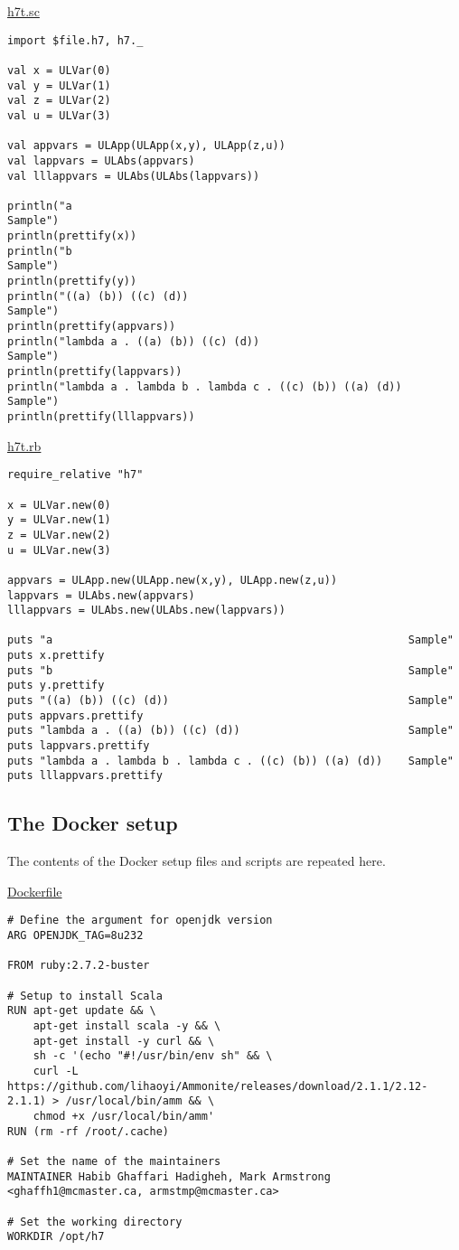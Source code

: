\documentclass[11pt]{article}
\begin{document}
\href{./testing/h7/h7t.sc}{h7t.sc}
\begin{verbatim}
import $file.h7, h7._

val x = ULVar(0)
val y = ULVar(1)
val z = ULVar(2)
val u = ULVar(3)

val appvars = ULApp(ULApp(x,y), ULApp(z,u))
val lappvars = ULAbs(appvars)
val lllappvars = ULAbs(ULAbs(lappvars))

println("a                                                       Sample")
println(prettify(x))
println("b                                                       Sample")
println(prettify(y))
println("((a) (b)) ((c) (d))                                     Sample")
println(prettify(appvars))
println("lambda a . ((a) (b)) ((c) (d))                          Sample")
println(prettify(lappvars))
println("lambda a . lambda b . lambda c . ((c) (b)) ((a) (d))    Sample")
println(prettify(lllappvars))
\end{verbatim}

\href{./testing/h7/h7t.rb}{h7t.rb}
\begin{verbatim}
require_relative "h7"

x = ULVar.new(0)
y = ULVar.new(1)
z = ULVar.new(2)
u = ULVar.new(3)

appvars = ULApp.new(ULApp.new(x,y), ULApp.new(z,u))
lappvars = ULAbs.new(appvars)
lllappvars = ULAbs.new(ULAbs.new(lappvars))

puts "a                                                       Sample"
puts x.prettify
puts "b                                                       Sample"
puts y.prettify
puts "((a) (b)) ((c) (d))                                     Sample"
puts appvars.prettify
puts "lambda a . ((a) (b)) ((c) (d))                          Sample"
puts lappvars.prettify
puts "lambda a . lambda b . lambda c . ((c) (b)) ((a) (d))    Sample"
puts lllappvars.prettify
\end{verbatim}

\subsection*{The Docker setup}
\label{sec:org4611436}
The contents of the Docker setup files and scripts are repeated here.

\href{./testing/h7/Dockerfile}{Dockerfile}
\begin{verbatim}
# Define the argument for openjdk version
ARG OPENJDK_TAG=8u232

FROM ruby:2.7.2-buster

# Setup to install Scala
RUN apt-get update && \
    apt-get install scala -y && \
    apt-get install -y curl && \
    sh -c '(echo "#!/usr/bin/env sh" && \
    curl -L https://github.com/lihaoyi/Ammonite/releases/download/2.1.1/2.12-2.1.1) > /usr/local/bin/amm && \
    chmod +x /usr/local/bin/amm'
RUN (rm -rf /root/.cache)
     
# Set the name of the maintainers
MAINTAINER Habib Ghaffari Hadigheh, Mark Armstrong <ghaffh1@mcmaster.ca, armstmp@mcmaster.ca>

# Set the working directory
WORKDIR /opt/h7
\end{verbatim}
\end{document}
